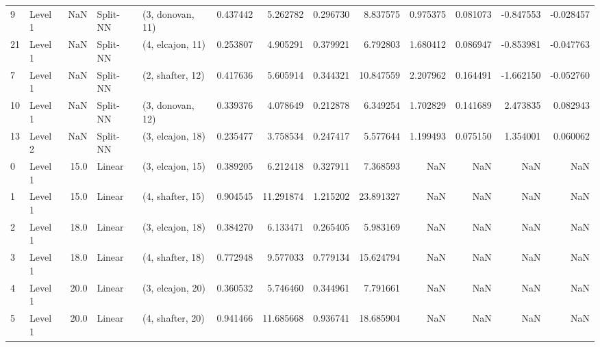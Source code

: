 \begin{tabular}{llrllrrrrrrrr}
9  &   Level 1 &    NaN &    Split-NN &  (3, donovan, 11) &   0.437442 &   5.262782 &  0.296730 &   8.837575 &             0.975375 &               0.081073 &           -0.847553 &             -0.028457 \\
21 &   Level 1 &    NaN &    Split-NN &  (4, elcajon, 11) &   0.253807 &   4.905291 &  0.379921 &   6.792803 &             1.680412 &               0.086947 &           -0.853981 &             -0.047763 \\
7  &   Level 1 &    NaN &    Split-NN &  (2, shafter, 12) &   0.417636 &   5.605914 &  0.344321 &  10.847559 &             2.207962 &               0.164491 &           -1.662150 &             -0.052760 \\
10 &   Level 1 &    NaN &    Split-NN &  (3, donovan, 12) &   0.339376 &   4.078649 &  0.212878 &   6.349254 &             1.702829 &               0.141689 &            2.473835 &              0.082943 \\
13 &   Level 2 &    NaN &    Split-NN &  (3, elcajon, 18) &   0.235477 &   3.758534 &  0.247417 &   5.577644 &             1.199493 &               0.075150 &            1.354001 &              0.060062 \\
0  &   Level 1 &   15.0 &      Linear &  (3, elcajon, 15) &   0.389205 &   6.212418 &  0.327911 &   7.368593 &                  NaN &                    NaN &                 NaN &                   NaN \\
1  &   Level 1 &   15.0 &      Linear &  (4, shafter, 15) &   0.904545 &  11.291874 &  1.215202 &  23.891327 &                  NaN &                    NaN &                 NaN &                   NaN \\
2  &   Level 1 &   18.0 &      Linear &  (3, elcajon, 18) &   0.384270 &   6.133471 &  0.265405 &   5.983169 &                  NaN &                    NaN &                 NaN &                   NaN \\
3  &   Level 1 &   18.0 &      Linear &  (4, shafter, 18) &   0.772948 &   9.577033 &  0.779134 &  15.624794 &                  NaN &                    NaN &                 NaN &                   NaN \\
4  &   Level 1 &   20.0 &      Linear &  (3, elcajon, 20) &   0.360532 &   5.746460 &  0.344961 &   7.791661 &                  NaN &                    NaN &                 NaN &                   NaN \\
5  &   Level 1 &   20.0 &      Linear &  (4, shafter, 20) &   0.941466 &  11.685668 &  0.936741 &  18.685904 &                  NaN &                    NaN &                 NaN &                   NaN \\

\end{tabular}
